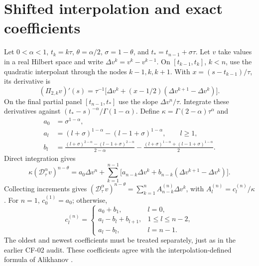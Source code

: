 \documentclass[11pt,a4paper]{article}
\newcommand{\D}{\mathcal D_\tau^\alpha}
\begin{document}
\section{Shifted interpolation and exact coefficients}
Let $0<\alpha<1$, $t_k=k\tau$, $\theta=\alpha/2$, $\sigma=1-\theta$, and $t_*=t_{n-1}+\sigma\tau$. Let $v$ take values in a real Hilbert space and write $\Delta v^k=v^k-v^{k-1}$. On $[t_{k-1},t_k]$, $k<n$, use the quadratic interpolant through the nodes $k-1,k,k+1$. With $x=(s-t_{k-1})/\tau$, its derivative is
\[
 (\Pi_{2,k}v)'(s)=\tau^{-1}\big[\Delta v^k+(x-1/2)(\Delta v^{k+1}-\Delta v^k)\big].
\]
On the final partial panel $[t_{n-1},t_*]$ use the slope $\Delta v^n/\tau$. Integrate these derivatives against $(t_*-s)^{-\alpha}/\Gamma(1-\alpha)$. Define $\kappa=\Gamma(2-\alpha)\tau^\alpha$ and
\begin{align*}
 a_0&=\sigma^{1-\alpha},\\
 a_l&=(l+\sigma)^{1-\alpha}-(l-1+\sigma)^{1-\alpha},\qquad l\ge1,\\
 b_l&=\frac{(l+\sigma)^{2-\alpha}-(l-1+\sigma)^{2-\alpha}}{2-\alpha}
 -\frac{(l+\sigma)^{1-\alpha}+(l-1+\sigma)^{1-\alpha}}2.
\end{align*}
Direct integration gives
\[
 \kappa(\D v)^{n-\theta}=a_0\Delta v^n+\sum_{k=1}^{n-1}\big[a_{n-k}\Delta v^k+b_{n-k}(\Delta v^{k+1}-\Delta v^k)\big].
\]
Collecting increments gives $ (\D v)^{n-\theta}=\sum_{k=1}^n A_{n-k}^{(n)}\Delta v^k$, with $A_l^{(n)}=c_l^{(n)}/\kappa$. For $n=1$, $c_0^{(1)}=a_0$; otherwise,
\[
 c_l^{(n)}=\begin{cases}
 a_0+b_1,&l=0,\\
 a_l-b_l+b_{l+1},&1\le l\le n-2,\\
 a_l-b_l,&l=n-1.
 \end{cases}
\]
The oldest and newest coefficients must be treated separately, just as in the earlier CF-02 audit. These coefficients agree with the interpolation-defined formula of Alikhanov \cite{alikhanov}.
\end{document}
